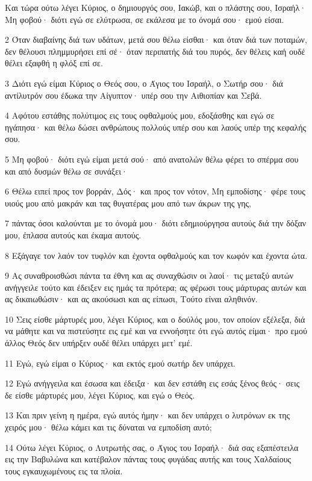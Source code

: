 \par Και τώρα ούτω λέγει Κύριος, ο δημιουργός σου, Ιακώβ, και ο πλάστης σου, Ισραήλ· Μη φοβού· διότι εγώ σε ελύτρωσα, σε εκάλεσα με το όνομά σου· εμού είσαι.
\par 2 Όταν διαβαίνης διά των υδάτων, μετά σου θέλω είσθαι· και όταν διά των ποταμών, δεν θέλουσι πλημμυρήσει επί σέ· όταν περιπατής διά του πυρός, δεν θέλεις καή ουδέ θέλει εξαφθή η φλόξ επί σε.
\par 3 Διότι εγώ είμαι Κύριος ο Θεός σου, ο Άγιος του Ισραήλ, ο Σωτήρ σου· διά αντίλυτρόν σου έδωκα την Αίγυπτον· υπέρ σου την Αιθιοπίαν και Σεβά.
\par 4 Αφότου εστάθης πολύτιμος εις τους οφθαλμούς μου, εδοξάσθης και εγώ σε ηγάπησα· και θέλω δώσει ανθρώπους πολλούς υπέρ σου και λαούς υπέρ της κεφαλής σου.
\par 5 Μη φοβού· διότι εγώ είμαι μετά σού· από ανατολών θέλω φέρει το σπέρμα σου και από δυσμών θέλω σε συνάξει·
\par 6 Θέλω ειπεί προς τον βορράν, Δός· και προς τον νότον, Μη εμποδίσης· φέρε τους υιούς μου από μακράν και τας θυγατέρας μου από των άκρων της γης,
\par 7 πάντας όσοι καλούνται με το όνομά μου· διότι εδημιούργησα αυτούς διά την δόξαν μου, έπλασα αυτούς και έκαμα αυτούς.
\par 8 Εξάγαγε τον λαόν τον τυφλόν και έχοντα οφθαλμούς και τον κωφόν και έχοντα ώτα.
\par 9 Ας συναθροισθώσι πάντα τα έθνη και ας συναχθώσιν οι λαοί· τις μεταξύ αυτών ανήγγειλε τούτο και έδειξεν εις ημάς τα πρότερα; ας φέρωσι τους μάρτυρας αυτών και ας δικαιωθώσιν· και ας ακούσωσι και ας είπωσι, Τούτο είναι αληθινόν.
\par 10 Σεις είσθε μάρτυρές μου, λέγει Κύριος, και ο δούλός μου, τον οποίον εξέλεξα, διά να μάθητε και να πιστεύσητε εις εμέ και να εννοήσητε ότι εγώ αυτός είμαι· προ εμού άλλος Θεός δεν υπήρξεν ουδέ θέλει υπάρχει μετ' εμέ.
\par 11 Εγώ, εγώ είμαι ο Κύριος· και εκτός εμού σωτήρ δεν υπάρχει.
\par 12 Εγώ ανήγγειλα και έσωσα και έδειξα· και δεν εστάθη εις εσάς ξένος θεός· σεις δε είσθε μάρτυρές μου, λέγει Κύριος, και εγώ ο Θεός.
\par 13 Και πριν γείνη η ημέρα, εγώ αυτός ήμην· και δεν υπάρχει ο λυτρόνων εκ της χειρός μου· θέλω κάμει και τις δύναται να εμποδίση αυτό;
\par 14 Ούτω λέγει Κύριος, ο Λυτρωτής σας, ο Άγιος του Ισραήλ· διά σας εξαπέστειλα εις την Βαβυλώνα και κατέβαλον πάντας τους φυγάδας αυτής και τους Χαλδαίους τους εγκαυχωμένους εις τα πλοία.
